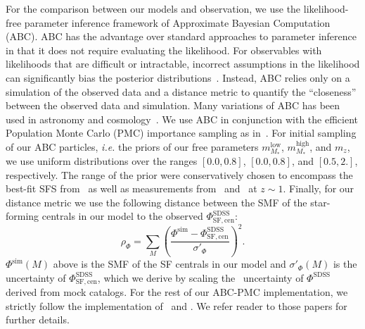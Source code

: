 \documentclass[12pt, letterpaper, preprint, tighten]{aastex62}
\newcommand{\beq}{\begin{equation}}
\newcommand{\eeq}{\end{equation}}
\begin{document}
For the comparison between our models and observation, we use the likelihood-free parameter
inference framework of Approximate Bayesian Computation (ABC). ABC has the
advantage over standard approaches to parameter inference in that it does not
require evaluating the likelihood. For observables with likelihoods that are
difficult or intractable, incorrect assumptions in the likelihood can significantly
bias the posterior distributions~\citep[\emph{e.g.}][]{hahn2018}. Instead,
ABC relies only on a simulation of the observed data and a distance metric to
quantify the ``closeness'' between the observed data and simulation. Many variations
of ABC has been used in astronomy and
cosmology~\citep[\emph{e.g.}][]{cameron2012,weyant2013,ishida2015,alsing2018}.
We use ABC in conjunction with the efficient Population Monte Carlo (PMC)
importance sampling as in~\cite{hahn2017b, hahn2017a}. For initial sampling
of our ABC particles, \emph{i.e.} the priors of our free parameters
$m^\mathrm{low}_{M_*}$, $m^\mathrm{high}_{M_*}$, and $m_z$, we use uniform
distributions over the ranges $[0.0, 0.8]$, $[0.0, 0.8]$, and
$[0.5, 2.]$, respectively. The range of the prior were conservatively chosen
to encompass the best-fit SFS from~\cite{speagle2014} as well as 
measurements from~\cite{moustakas2013} and~\cite{lee2015} at $z \sim 1$.
Finally, for our distance metric we use the following distance between
the SMF of the star-forming centrals in our model to the observed
$\Phi^\mathrm{SDSS}_\mathrm{SF,cen}$:
\beq
\rho_\Phi = \sum\limits_{M} \left( \frac{\Phi^\mathrm{sim} - \Phi^\mathrm{SDSS}_\mathrm{SF,cen}}{\sigma'_\Phi}\right)^2.
\eeq
$\Phi^\mathrm{sim}(M)$ above is the SMF of the SF centrals in our model
and $\sigma'_\Phi(M)$ is the uncertainty of $\Phi^\mathrm{SDSS}_\mathrm{SF,cen}$,
which we derive by scaling the~\cite{li2009} uncertainty of $\Phi^\mathrm{SDSS}$
derived from mock catalogs. %
For the rest of our ABC-PMC implementation, we strictly follow the implementation
of~\cite{hahn2017a} and \cite{hahn2017b}. We refer reader to those papers for
further details.
\end{document}
